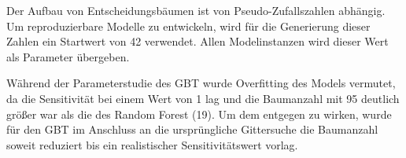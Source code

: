 Der Aufbau von Entscheidungsbäumen ist von Pseudo-Zufallszahlen abhängig. Um reproduzierbare Modelle zu entwickeln, wird für die Generierung dieser Zahlen ein Startwert von \num{42} verwendet. Allen Modelinstanzen wird dieser Wert als Parameter übergeben.

Während der Parameterstudie des GBT wurde Overfitting des Models vermutet, da die Sensitivität bei einem Wert von \num{1} lag und die Baumanzahl mit \num{95} deutlich größer war als die des Random Forest (19). Um dem entgegen zu wirken, wurde für den GBT im Anschluss an die ursprüngliche Gittersuche die Baumanzahl soweit reduziert bis ein realistischer Sensitivitätswert vorlag.
